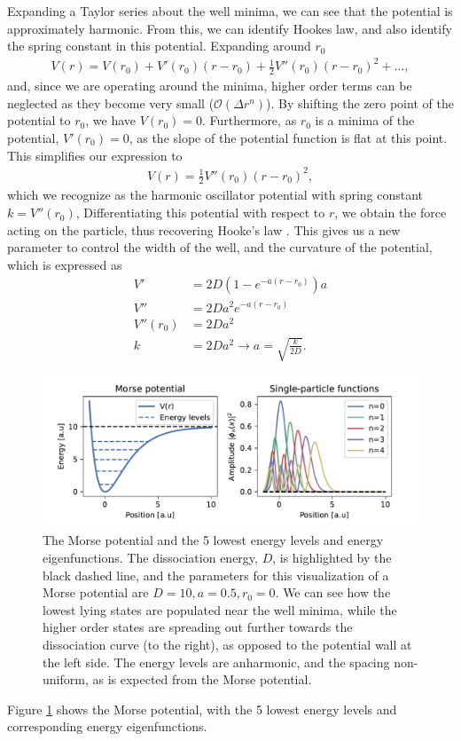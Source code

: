\documentclass{subfiles}
\begin{document}
Expanding a Taylor series about the well minima, we can see that the potential is approximately harmonic. From this, we can identify Hookes law, and also identify the spring constant in this potential. Expanding around $r_0$
\begin{align*}
    V(r) = V(r_0) + V'(r_0)(r-r_0) + \frac{1}{2}V''(r_0)(r-r_0)^2 + ...,
\end{align*}
and, since we are operating around the minima, higher order terms can be neglected as they become very small ($\mathcal{O}(\Delta r^n)$). By shifting the zero point of the potential to $r_0$, we have $V(r_0) = 0$. Furthermore, as $r_0$ is a minima of the potential, $V'(r_0) = 0$, as the slope of the potential function is flat at this point. This simplifies our expression to
\begin{align*}
    V(r) = \frac{1}{2}V''(r_0)(r-r_0)^2,
\end{align*}
which we recognize as the harmonic oscillator potential with spring constant $k = V''(r_0)$, Differentiating this potential with respect to $r$, we obtain the force acting on the particle, thus recovering Hooke's law \cite{piela2006ideas}. This gives us a new parameter to control the width of the well, and the curvature of the potential, which is expressed as
\begin{align*}
    V' &= 2D(1 - e^{-a(r-r_0)})a \\
    V'' &= 2Da^2e^{-a(r-r_0)} \\
    V''(r_0) &= 2Da^2 \\
    k &= 2Da^2 \rightarrow a = \sqrt{\frac{k}{2D}}.
\end{align*} 
\begin{figure}[h!]
    \centering
    \includegraphics[width=1.0\textwidth]{figs/potential_spf.pdf}
    \caption{The Morse potential and the 5 lowest energy levels and energy eigenfunctions. The dissociation energy, $D$, is highlighted by the black dashed line, and the parameters for this visualization of a Morse potential are $D=10, a=0.5, r_0=0$. We can see how the lowest lying states are populated near the well minima, while the higher order states are spreading out further towards the dissociation curve (to the right), as opposed to the potential wall at the left side. The energy levels are anharmonic, and the spacing non-uniform, as is expected from the Morse potential. }
    \label{fig:morse_potential}
\end{figure}
Figure \ref{fig:morse_potential} shows the Morse potential, with the 5 lowest energy levels and corresponding energy eigenfunctions. \\
\end{document}
